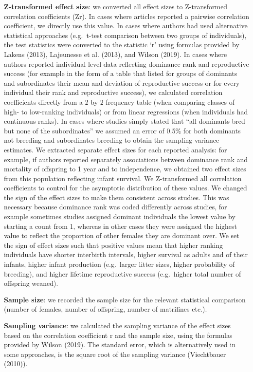 \documentclass[]{article}
\begin{document}
\textbf{Z-transformed effect size}: we converted all effect sizes to
Z-transformed correlation coefficients (Zr). In cases where articles
reported a pairwise correlation coefficient, we directly use this value.
In cases where authors had used alternative statistical approaches
(e.g.~t-test comparison between two groups of individuals), the test
statistics were converted to the statistic `r' using formulas provided
by Lakens (2013), Lajeunesse et al. (2013), and Wilson (2019). In cases
where authors reported individual-level data reflecting dominance rank
and reproductive success (for example in the form of a table that listed
for groups of dominants and subordinates their mean and deviation of
reproductive success or for every individual their rank and reproductive
success), we calculated correlation coefficients directly from a 2-by-2
frequency table (when comparing classes of high- to low-ranking
individuals) or from linear regressions (when individuals had continuous
ranks). In cases where studies simply stated that ``all dominants bred
but none of the subordinates'' we assumed an error of 0.5\% for both
dominants not breeding and subordinates breeding to obtain the sampling
variance estimates. We extracted separate effect sizes for each reported
analysis: for example, if authors reported separately associations
between dominance rank and mortality of offspring to 1 year and to
independence, we obtained two effect sizes from this population
reflecting infant survival. We Z-transformed all correlation
coefficients to control for the asymptotic distribution of these values.
We changed the sign of the effect sizes to make them consistent across
studies. This was necessary because dominance rank was coded differently
across studies, for example sometimes studies assigned dominant
individuals the lowest value by starting a count from 1, whereas in
other cases they were assigned the highest value to reflect the
proportion of other females they are dominant over. We set the sign of
effect sizes such that positive values mean that higher ranking
individuals have shorter interbirth intervals, higher survival as adults
and of their infants, higher infant production (e.g.~larger litter
sizes, higher probability of breeding), and higher lifetime reproductive
success (e.g.~higher total number of offspring weaned).

\textbf{Sample size}: we recorded the sample size for the relevant
statistical comparison (number of females, number of offspring, number
of matrilines etc.).

\textbf{Sampling variance}: we calculated the sampling variance of the
effect sizes based on the correlation coefficient r and the sample size,
using the formulas provided by Wilson (2019). The standard error, which
is alternatively used in some approaches, is the square root of the
sampling variance (Viechtbauer (2010)).
\end{document}
